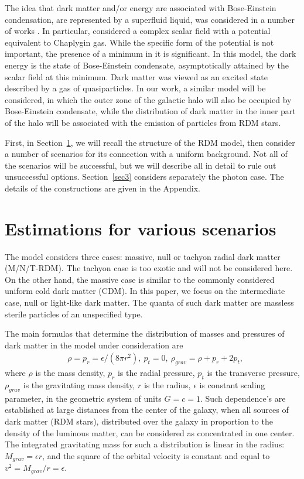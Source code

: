 \documentclass{article}
\begin{document}
The idea that dark matter and/or energy are associated with Bose-Einstein condensation, are represented by a superfluid liquid, was considered in a number of works \cite {2006.06129,1911.07371,1309.5707, hep-ph/9507385,1512.00108,1710.08910,0912.1609}. In particular, \cite {0912.1609} considered a complex scalar field with a potential equivalent to Chaplygin gas. While the specific form of the potential is not important, the presence of a minimum in it is significant. In this model, the dark energy is the state of Bose-Einstein condensate, asymptotically attained by the scalar field at this minimum. Dark matter was viewed as an excited state described by a gas of quasiparticles. In our work, a similar model will be considered, in which the outer zone of the galactic halo will also be occupied by Bose-Einstein condensate, while the distribution of dark matter in the inner part of the halo will be associated with the emission of particles from RDM stars.

First, in Section~\ref {sec2}, we will recall the structure of the RDM model, then consider a number of scenarios for its connection with a uniform background. Not all of the scenarios will be successful, but we will describe all in detail to rule out unsuccessful options. Section~\ref {sec3} considers separately the photon case. The details of the constructions are given in the Appendix. 

\section{Estimations for various scenarios}\label{sec2}

The model \cite {bled2020} considers three cases: massive, null or tachyon radial dark matter (M/N/T-RDM). The tachyon case is too exotic and will not be considered here. On the other hand, the massive case is similar to the commonly considered uniform cold dark matter (CDM). In this paper, we focus on the intermediate case, null or light-like dark matter. The quanta of such dark matter are massless sterile particles of an unspecified type.

The main formulas that determine the distribution of masses and pressures of dark matter in the model under consideration are 
\begin{eqnarray}
&\rho=p_r=\epsilon/(8\pi r^2),\ p_t=0,\ \rho_{grav}=\rho+p_r+2p_t,
\end{eqnarray}
where $ \rho $ is the mass density, $ p_r $ is the radial pressure, $ p_t $ is the transverse pressure, $ \rho_ {grav} $ is the gravitating mass density, $ r $ is the radius, $ \epsilon $ is constant scaling parameter, in the geometric system of units $ G = c = 1 $. Such dependence's are established at large distances from the center of the galaxy, when all sources of dark matter (RDM stars), distributed over the galaxy in proportion to the density of the luminous matter, can be considered as concentrated in one center. The integrated gravitating mass for such a distribution is linear in the radius: $ M_ {grav} = \epsilon r $, and the square of the orbital velocity is constant and equal to $ v ^ 2 = M_ {grav} / r = \epsilon $.
\end{document}
